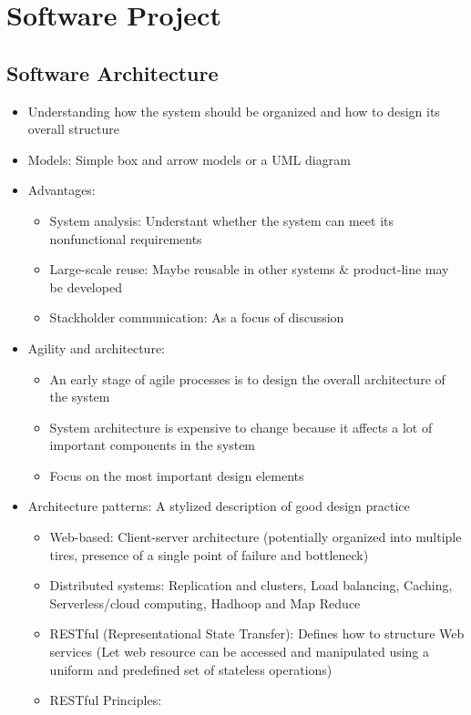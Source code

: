 \documentclass[12pt,openany]{book}
\begin{document}
\chapter{Software Project}
\section{Software Architecture}
\begin{itemize}
    \item Understanding how the system should be organized and how to design its overall structure
    \item Models: Simple box and arrow models or a UML diagram
    \item Advantages:
    \begin{itemize}
        \item System analysis: Understant whether the system can meet its nonfunctional requirements
        \item Large-scale reuse: Maybe reusable in other systems \& product-line may be developed
        \item Stackholder communication: As a focus of discussion
    \end{itemize}
    \item Agility and architecture:
    \begin{itemize}
        \item An early stage of agile processes is to design the overall architecture of the system
        \item System architecture is expensive to change because it affects a lot of important components in the system
        \item Focus on the most important design elements
    \end{itemize}
    \item Architecture patterns: A stylized description of good design practice
    \begin{itemize}
        \item Web-based: Client-server architecture (potentially organized into multiple tires, presence of a single point of failure and bottleneck)
        \item Distributed systems: Replication and clusters, Load balancing, Caching, Serverless/cloud computing, Hadhoop and Map Reduce
        \item RESTful (Representational State Transfer): Defines how to structure Web services (Let web resource can be accessed and manipulated using a uniform and predefined set of stateless operations)\item RESTful Principles:

\end{itemize}
\end{itemize}
\end{document}
